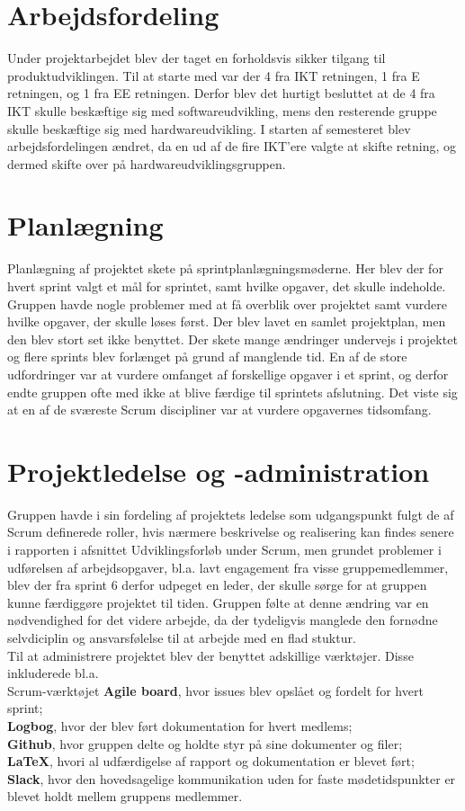 \section{Arbejdsfordeling}
Under projektarbejdet blev der taget en forholdsvis sikker tilgang til produktudviklingen. Til at starte med var der 4 fra IKT retningen, 1 fra E retningen, og 1 fra EE retningen. Derfor blev det hurtigt besluttet at de 4 fra IKT skulle beskæftige sig med softwareudvikling, mens den resterende gruppe skulle beskæftige sig med hardwareudvikling. I starten af semesteret blev arbejdsfordelingen ændret, da en ud af de fire IKT’ere valgte at skifte retning, og dermed skifte over på hardwareudviklingsgruppen.


\section{Planlægning}
Planlægning af projektet skete på sprintplanlægningsmøderne. Her blev der for hvert sprint valgt et mål for sprintet, samt hvilke opgaver, det skulle indeholde. Gruppen havde nogle problemer med at få overblik over projektet samt vurdere hvilke opgaver, der skulle løses først. Der blev lavet en samlet projektplan, men den blev stort set ikke benyttet.
Der skete mange ændringer undervejs i projektet og flere sprints blev forlænget på grund af manglende tid. En af de store udfordringer var at vurdere omfanget af forskellige opgaver i et sprint, og derfor endte gruppen ofte med ikke at blive færdige til sprintets afslutning. Det viste sig at en af de sværeste Scrum discipliner var at vurdere opgavernes tidsomfang. 

\section{Projektledelse og -administration}
Gruppen havde i sin fordeling af projektets ledelse som udgangspunkt fulgt de af Scrum definerede roller, hvis nærmere beskrivelse og realisering kan findes senere i rapporten i afsnittet Udviklingsforløb under Scrum, men grundet problemer i udførelsen af arbejdsopgaver, bl.a. lavt engagement fra visse gruppemedlemmer, blev der fra sprint 6 derfor udpeget en leder, der skulle sørge for at gruppen kunne færdiggøre projektet til tiden. Gruppen følte at denne
ændring var en nødvendighed for det videre arbejde, da der tydeligvis manglede den fornødne selvdiciplin
og ansvarsfølelse til at arbejde med en flad stuktur.
\\
Til at administrere projektet blev der benyttet adskillige værktøjer. Disse inkluderede bl.a. \\
Scrum-værktøjet \textbf{Agile board}, hvor issues blev opslået og fordelt for hvert sprint; \\
\textbf{Logbog}, hvor der blev ført dokumentation for hvert medlems; \\
\textbf{Github}, hvor gruppen delte og holdte styr på sine dokumenter og filer; \\
\textbf{LaTeX}, hvori al udfærdigelse af rapport og dokumentation er blevet ført; \\
\textbf{Slack}, hvor den hovedsagelige kommunikation uden for faste mødetidspunkter er blevet holdt mellem gruppens medlemmer.

